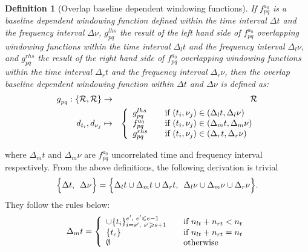 \documentclass[useAMS,usenatbib]{mn2e}
\newtheorem{definition}[theorem]{Definition}
\begin{document}
\begin{definition}[Overlap baseline dependent windowing functions]
 \label{def:4}
If $f_{pq}^{a_0}$ is a baseline dependent windowing function defined within the time interval $\Delta t$ and the frequency interval 
$\Delta \nu$, $g^{lhs}_{pq}$ the result of the left hand side of $f_{pq}^{a_0}$ overlapping windowing functions within the time interval 
$\Delta_l t$ and the frequency interval $\Delta_l \nu$, and $g^{rhs}_{pq}$  the result of the right hand side of $f_{pq}^{a_0}$ overlapping 
windowing functions within the time interval $\Delta_r t$ and the frequency interval 
$\Delta_r \nu$, then the overlap baseline dependent windowing function within  $\Delta t$ and $\Delta \nu$ is defined as:
\begin{eqnarray*}
 g^{}_{pq}: \{\mathbf{\mathcal{R}},\mathbf{\mathcal{R}}\} &\rightarrow& \mathbf{\mathcal{R}}\\
                   d_{t_i},d_{\nu_j} &\mapsto&
 \left\{ 
  \begin{array}{l l}
    g^{lhs}_{pq} & \quad \text{if $(t_i,\nu_j) \in (\Delta_l t, \Delta_l \nu)$}\\
    f^{a_0}_{pq} & \quad \text{if $(t_i,\nu_j) \in (\Delta_m t, \Delta_m \nu)$}\\
    g^{rhs}_{pq}& \quad \text{if $(t_i,\nu_j) \in (\Delta_r t, \Delta_r \nu)$}
  \end{array} \right.
\end{eqnarray*}
\end{definition}
where $\Delta_m t$ and $\Delta_m \nu$ are $f_{pq}^{a_0}$ uncorrelated time  and frequency interval respectively. From the above 
definitions, the following derivation is trivial 
\begin{equation*}
 \Big\{\Delta t,\hspace{0.17cm}\Delta \nu \Big\}=\Big\{\Delta_l t \cup \Delta_m t \cup \Delta_r t, \hspace{0.17cm}\Delta_l \nu \cup 
\Delta_m \nu \cup \Delta_r \nu \Big\}.
\end{equation*}
 They follow the rules below:
\begin{eqnarray*}
 \Delta_m t= \left\{ 
  \begin{array}{l l}
     \cup\{t_i\}_{i=s',\hspace{0.1cm} s' \geq s+1}^{e', \hspace{0.1cm}e'\leq e-1} & \quad \text{if $n_{lt}+n_{rt}< n_t$}\\
      \{t_c\}& \quad \text{if $n_{lt}+n_{rt} = n_t$}\\
       \emptyset  & \quad \text{otherwise}
  \end{array} \right.
\end{eqnarray*}
\end{document}
